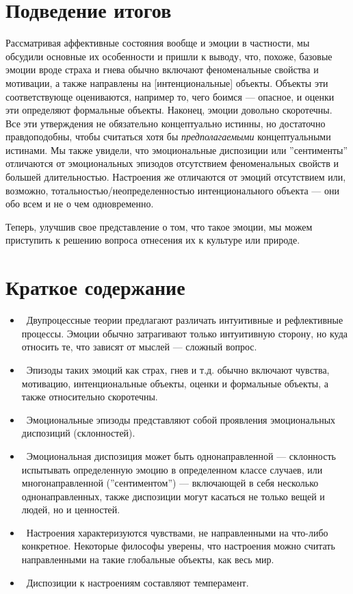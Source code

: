 \documentclass[11pt]{book}
\begin{document}
\section{Подведение итогов}

Рассматривая аффективные состояния вообще и эмоции в частности, мы обсудили основные их особенности и пришли к выводу, что, похоже, базовые эмоции вроде страха и гнева обычно включают феноменальные свойства и мотивации, а также направлены на [интенциональные] объекты. Объекты эти соответствующе оцениваются, например то, чего боимся --- опасное, и оценки эти определяют формальные объекты. Наконец, эмоции довольно скоротечны. Все эти утверждения не обязательно концептуально истинны, но достаточно правдоподобны, чтобы считаться хотя бы \textit{предполагаемыми} концептуальными истинами. Мы также увидели, что эмоциональные диспозиции или ''сентименты'' отличаются от эмоциональных эпизодов отсутствием феноменальных свойств и большей длительностью. Настроения же отличаются от эмоций отсутствием или, возможно, тотальностью/неопределенностью интенционального объекта --- они обо всем и не о чем одновременно.

Теперь, улучшив свое представление о том, что такое эмоции, мы можем приступить к решению вопроса отнесения их к культуре или природе.

\section{Краткое содержание}

\begin{itemize}
  \item\ Двупроцессные теории предлагают различать интуитивные и рефлективные процессы. Эмоции обычно затрагивают только интуитивную сторону, но куда относить те, что зависят от мыслей --- сложный вопрос.
  \item\ Эпизоды таких эмоций как страх, гнев и т.д. обычно включают чувства, мотивацию, интенциональные объекты, оценки и формальные объекты, а также относительно скоротечны.
  \item\ Эмоциональные эпизоды представляют собой проявления эмоциональных диспозиций (склонностей).
  \item\ Эмоциональная диспозиция может быть однонаправленной --- склонность испытывать определенную эмоцию в определенном классе случаев, или многонаправленной (''сентиментом'') --- включающей в себя несколько однонаправленных, также диспозиции могут касаться не только вещей и людей, но и ценностей.
  \item\ Настроения характеризуются чувствами, не направленными на что-либо конкретное. Некоторые философы уверены, что настроения можно считать направленными на такие глобальные объекты, как весь мир.
  \item\ Диспозиции к настроениям составляют темперамент.
\end{itemize}
\end{document}
